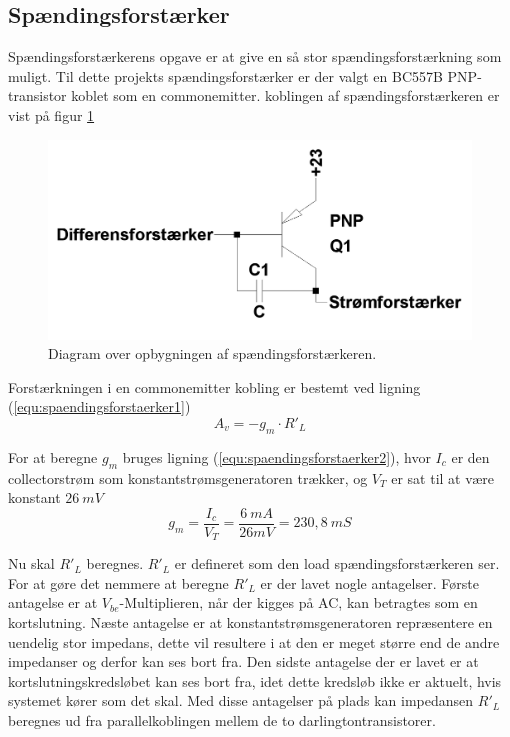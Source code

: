 \subsection{Spændingsforstærker}
\label{effekt_spaendingsforstaerker}
Spændingsforstærkerens opgave er at give en så stor spændingsforstærkning som muligt. Til dette projekts spændingsforstærker er der valgt en BC557B PNP-transistor koblet som en commonemitter. koblingen af spændingsforstærkeren er vist på figur \ref{spaendingsforstaerker_diagram}

\begin{figure}[h]
\centering
\includegraphics[scale=0.2]{teknisk/effektforstaerker/spaendingsforstaerker_diagram.png}
\caption{Diagram over opbygningen af spændingsforstærkeren.}
\label{spaendingsforstaerker_diagram}
\end{figure}

Forstærkningen i en commonemitter kobling er bestemt ved ligning (\ref{equ:spaendingsforstaerker1})  
\begin{equation}
\label{equ:spaendingsforstaerker1}
A_v = -g_m \cdot R'_L
\end{equation}

For at beregne $g_m$ bruges ligning (\ref{equ:spaendingsforstaerker2}), hvor $I_c$ er den collectorstrøm som konstantstrømsgeneratoren trækker, og $V_T$ er sat til at være konstant $26~mV$
\begin{equation}
\label{equ:spaendingsforstaerker2}
g_m = \frac{I_c}{V_T} = \frac{6~mA}{26mV} = 230,8~mS
\end{equation}

Nu skal $R'_L$ beregnes. $R'_L$ er defineret som den load spændingsforstærkeren ser. For at gøre det nemmere at beregne $R'_L$ er der lavet nogle antagelser. Første antagelse er at $V_{be}$-Multiplieren, når der kigges på AC, kan betragtes som en kortslutning. Næste antagelse er at konstantstrømsgeneratoren repræsentere en uendelig stor impedans, dette vil resultere i at den er meget større end de andre impedanser og derfor kan ses bort fra. Den sidste antagelse der er lavet er at kortslutningskredsløbet kan ses bort fra, idet dette kredsløb ikke er aktuelt, hvis systemet  kører som det skal. Med disse antagelser på plads kan impedansen $R'_L$ beregnes ud fra parallelkoblingen mellem de to darlingtontransistorer.


